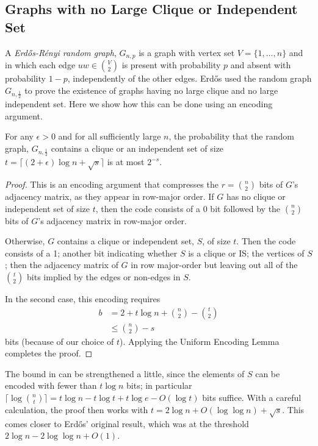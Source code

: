 \documentclass[lotsofwhite]{patmorin}
\begin{document}
\subsection{Graphs with no Large Clique or Independent Set}


A \emph{Erd\H{o}s-R\'enyi random graph}, $G_{n,p}$ is a graph with vertex
set $V=\{1,\ldots,n\}$ and in which each edge $uw\in \binom{V}{2}$
is present with probability $p$ and absent with probability $1-p$,
independently of the other edges.  Erd\H{o}s \cite{X} used the random
graph $G_{n,\frac{1}{2}}$ to prove the existence of graphs having no
large clique and no large independent set. Here we show how this can be
done using an encoding argument.

\begin{thm}
  For any $\epsilon>0$ and for all sufficiently large $n$, the probability
  that the random graph, $G_{n,\frac{1}{2}}$ contains a clique or an
  independent set of size $t = \lceil(2+\epsilon)\log n + \sqrt{s}\rceil$
  is at most $2^{-s}$.
\end{thm}

\begin{proof}
  This is an encoding argument that compresses the $r=\binom{n}{2}$ bits
  of $G$'s adjacency matrix, as they appear in row-major order.  If $G$
  has no clique or independent set of size $t$, then the code consists of
  a 0 bit followed by the $\binom{n}{2}$ bits of $G$'s adjacency matrix
  in row-major order.
  
  Otherwise, $G$ contains a clique or independent set, $S$, of size $t$.
  Then the code consists of a 1; another bit indicating whether $S$ is a
  clique or IS; the vertices of $S$; then the adjacency matrix of $G$ in
  row major-order but leaving out all of the $\binom{t}{2}$ bits implied
  by the edges or non-edges in $S$.
  
  In the second case, this encoding requires 
  \begin{align*}
     b & = 2 + t\log n + \binom{n}{2}-\binom{t}{2} \\
       & \le \binom{n}{2} - s 
  \end{align*}
  bits (because of our choice of $t$).   Applying the Uniform Encoding
  Lemma completes the proof.
\end{proof}

\begin{rem}
The bound in  can be strengthened a little, since
the elements of $S$ can be encoded with fewer than $t\log n$ bits; in
particular $\lceil\log\binom{n}{t}\rceil=t\log n - t\log t + t\log e -
O(\log t)$ bits suffice.  With a careful calculation, the proof then
works with $t=2\log n +O(\log\log n) + \sqrt{s}$. This comes closer to
Erdős' original result, which was at the threshold $2\log n - 2\log\log
n + O(1)$.
\end{rem}
\end{document}
